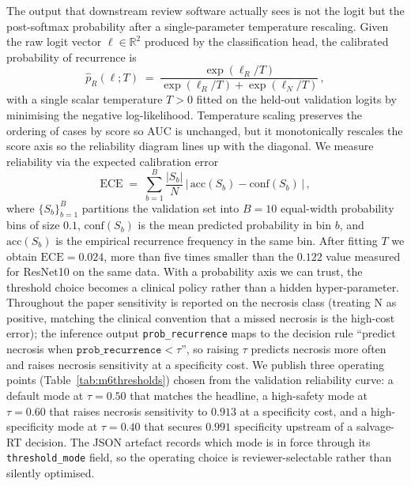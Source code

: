 \documentclass[11pt,a4paper]{article}
\begin{document}
The output that downstream review software actually sees is not the logit but the post-softmax probability after a single-parameter temperature rescaling. Given the raw logit vector $\bm{\ell} \in \mathbb{R}^2$ produced by the classification head, the calibrated probability of recurrence is
\begin{equation}
\hat{p}_{R}(\bm{\ell}; T) \;=\; \frac{\exp(\ell_R / T)}{\exp(\ell_R / T) + \exp(\ell_N / T)}\,,
\label{eq:temperature}
\end{equation}
with a single scalar temperature $T>0$ fitted on the held-out validation logits by minimising the negative log-likelihood. Temperature scaling preserves the ordering of cases by score so AUC is unchanged, but it monotonically rescales the score axis so the reliability diagram lines up with the diagonal. We measure reliability via the expected calibration error
\begin{equation}
\text{ECE} \;=\; \sum_{b=1}^{B} \frac{|S_b|}{N}\,\big|\, \mathrm{acc}(S_b) - \mathrm{conf}(S_b) \,\big|\,,
\label{eq:ece}
\end{equation}
where $\{S_b\}_{b=1}^{B}$ partitions the validation set into $B=10$ equal-width probability bins of size $0.1$, $\mathrm{conf}(S_b)$ is the mean predicted probability in bin $b$, and $\mathrm{acc}(S_b)$ is the empirical recurrence frequency in the same bin. After fitting $T$ we obtain $\text{ECE} = 0.024$, more than five times smaller than the $0.122$ value measured for ResNet10 on the same data. With a probability axis we can trust, the threshold choice becomes a clinical policy rather than a hidden hyper-parameter. Throughout the paper sensitivity is reported on the necrosis class (treating N as positive, matching the clinical convention that a missed necrosis is the high-cost error); the inference output \texttt{prob\_recurrence} maps to the decision rule ``predict necrosis when $\texttt{prob\_recurrence} < \tau$'', so raising $\tau$ predicts necrosis more often and raises necrosis sensitivity at a specificity cost. We publish three operating points (Table~\ref{tab:m6thresholds}) chosen from the validation reliability curve: a default mode at $\tau=0.50$ that matches the headline, a high-safety mode at $\tau=0.60$ that raises necrosis sensitivity to $0.913$ at a specificity cost, and a high-specificity mode at $\tau=0.40$ that secures $0.991$ specificity upstream of a salvage-RT decision. The JSON artefact records which mode is in force through its \texttt{threshold\_mode} field, so the operating choice is reviewer-selectable rather than silently optimised.
\end{document}
